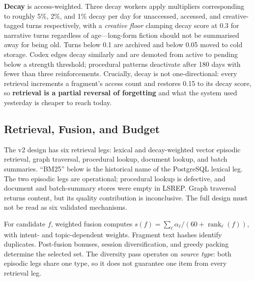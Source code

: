 \documentclass[twoside,11pt]{article}
\begin{document}
\textbf{Decay} is access-weighted. Three decay workers apply multipliers corresponding to roughly 5\%, 2\%, and 1\% decay per day for unaccessed, accessed, and creative-tagged turns respectively, with a \emph{creative floor} clamping decay score at 0.3 for narrative turns regardless of age---long-form fiction should not be summarised away for being old. Turns below 0.1 are archived and below 0.05 moved to cold storage. Codex edges decay similarly and are demoted from active to pending below a strength threshold; procedural patterns deactivate after 180 days with fewer than three reinforcements. Crucially, decay is not one-directional: every retrieval increments a fragment's access count and restores 0.15 to its decay score, so \textbf{retrieval is a partial reversal of forgetting} and what the system used yesterday is cheaper to reach today.

\subsection{Retrieval, Fusion, and Budget}
\label{sec:orchestrator}
The v2 design has six retrieval legs: lexical and decay-weighted vector episodic retrieval, graph traversal, procedural lookup, document lookup, and batch summaries. ``BM25'' below is the historical name of the PostgreSQL lexical leg. The two episodic legs are operational; procedural lookup is defective, and document and batch-summary stores were empty in LSREP. Graph traversal returns content, but its quality contribution is inconclusive. The full design must not be read as six validated mechanisms.

For candidate $f$, weighted fusion computes $s(f)=\sum_\ell\alpha_\ell/(60+\operatorname{rank}_\ell(f))$, with intent- and topic-dependent weights. Fragment text hashes identify duplicates. Post-fusion bonuses, session diversification, and greedy packing determine the selected set. The diversity pass operates on \emph{source type}: both episodic legs share one type, so it does not guarantee one item from every retrieval leg.
\end{document}
